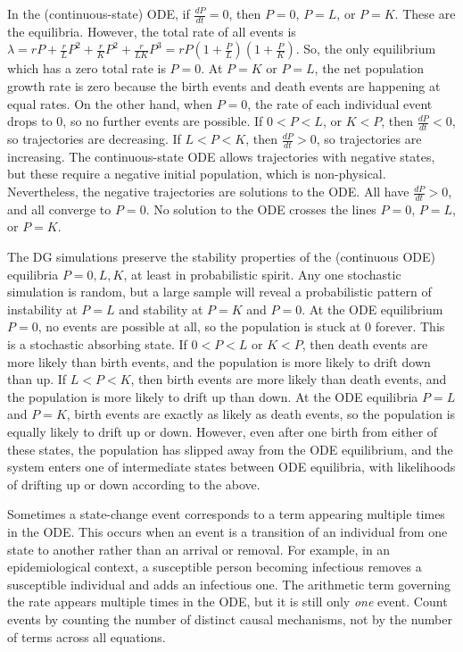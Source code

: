 \begin{example}
In the (continuous-state) ODE, if $\frac{dP}{dt} = 0$, then $P = 0$, $P = L$, or $P = K$. These are the equilibria.
However, the total rate of all events is $\lambda = rP + \frac{r}{L}P^2 + \frac{r}{K}P^2 + \frac{r}{LK}P^3 = rP(1 + \frac{P}{L})(1 + \frac{P}{K})$.
So, the only equilibrium which has a zero total rate is $P = 0$.
At $P = K$ or $P = L$, the net population growth rate is zero because the birth events and death events are happening at equal rates.
On the other hand, when $P = 0$, the rate of each individual event drops to $0$, so no further events are possible.
If $0 < P < L$, or $K < P$, then $\frac{dP}{dt} < 0$, so trajectories are decreasing.
If $L < P < K$, then $\frac{dP}{dt} > 0$, so trajectories are increasing.
The continuous-state ODE allows trajectories with negative states, but these require a negative initial population, which is non-physical.
Nevertheless, the negative trajectories are solutions to the ODE. All have $\frac{dP}{dt} > 0$, and all converge to $P = 0$.
No solution to the ODE crosses the lines $P = 0$, $P = L$, or $P = K$.

The DG simulations preserve the stability properties of the (continuous ODE) equilibria $P = 0, L, K$, at least in probabilistic spirit.
Any one stochastic simulation is random, but a large sample will reveal a probabilistic pattern of instability at $P = L$ and stability at $P = K$ and $P = 0$.
At the ODE equilibrium $P = 0$, no events are possible at all, so the population is stuck at $0$ forever.
This is a stochastic absorbing state.
If $0 < P < L$ or $K < P$, then  death events are more likely than birth events, and the population is more likely to drift down than up.
If $L < P < K$, then birth events are more likely than death events, and the population is more likely to drift up than down.
At the ODE equilibria $P = L$ and $P = K$, birth events are exactly as likely as death events, so the population is equally likely to drift up or down.
However, even after one birth from either of these states, the population has slipped away from the ODE equilibrium, and the system enters one of intermediate states between ODE equilibria, with likelihoods of drifting up or down according to the above.
\end{example}

Sometimes a state-change event corresponds to a term appearing multiple times in the ODE.
This occurs when an event is a transition of an individual from one state to another rather than an arrival or removal.
For example, in an epidemiological context, a susceptible person becoming infectious removes a susceptible individual and adds an infectious one.
The arithmetic term governing the rate appears multiple times in the ODE, but it is still only \emph{one} event.
Count events by counting the number of distinct causal mechanisms, not by the number of terms across all equations.

